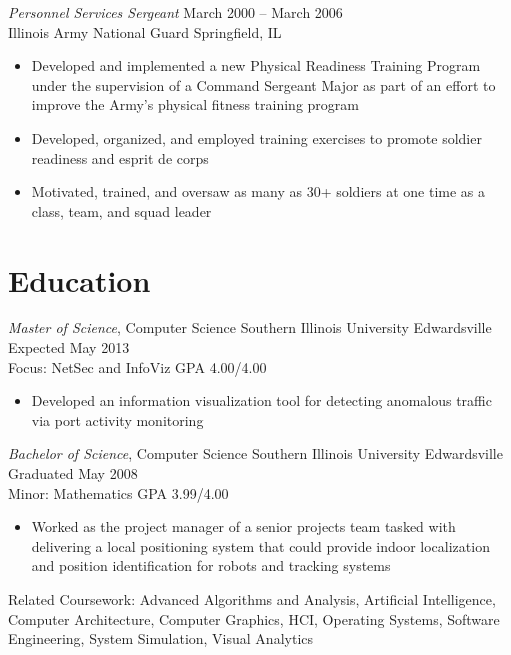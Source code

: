 \documentclass[margin,line]{resume}
\begin{document}
\begin{resume}
{\sl Personnel Services Sergeant}   \hfill   March 2000 -- March 2006\\
Illinois Army National Guard        \hfill   Springfield, IL
\begin{itemize} \itemsep -2pt %
\small\item Developed and implemented a new Physical Readiness Training Program under the supervision of a
            Command Sergeant Major as part of an effort to improve the Army's physical fitness training program
\small\item Developed, organized, and employed training exercises to promote soldier readiness and esprit de corps
\small\item Motivated, trained, and oversaw as many as 30+ soldiers at one time as a class, team, and squad leader
\end{itemize}

\section{Education}
{\small
  {\sl Master of Science}, Computer Science \hfill
  Southern Illinois University Edwardsville \hfill
  Expected May 2013\\
  Focus: NetSec and InfoViz \hfill
  GPA 4.00/4.00
}
\begin{itemize} \itemsep -2pt %
\small\item[] Developed an information visualization tool for detecting anomalous traffic via port activity
monitoring
\end{itemize}

{\small
  {\sl Bachelor of Science}, Computer Science \hfill
  Southern Illinois University Edwardsville   \hfill
  Graduated May 2008\\
  Minor: Mathematics \hfill
  GPA 3.99/4.00
}
\begin{itemize} \itemsep -2pt %
\small\item[] Worked as the project manager of a senior projects team tasked with delivering a local positioning
              system that could provide indoor localization and position identification for robots and tracking systems
\end{itemize}

{\small
  Related Coursework: Advanced Algorithms and Analysis, Artificial Intelligence,
  Computer Architecture, Computer Graphics, HCI, Operating Systems, Software
  Engineering, System Simulation, Visual Analytics
}

\end{resume}
\end{document}
